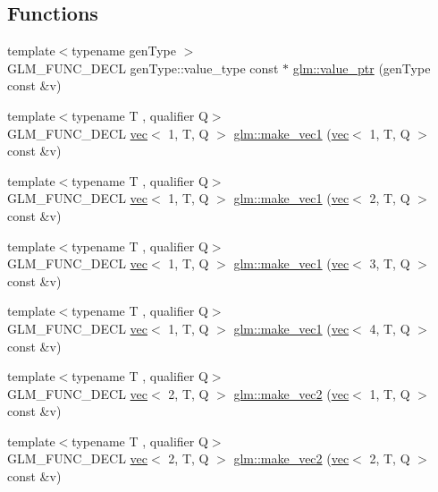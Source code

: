 \subsection*{Functions}
\begin{DoxyCompactItemize}
\item 
{\footnotesize template$<$typename gen\+Type $>$ }\\G\+L\+M\+\_\+\+F\+U\+N\+C\+\_\+\+D\+E\+CL gen\+Type\+::value\+\_\+type const  $\ast$ \hyperlink{group__gtc__type__ptr_ga1c64669e1ba1160ad9386e43dc57569a}{glm\+::value\+\_\+ptr} (gen\+Type const \&v)
\item 
{\footnotesize template$<$typename T , qualifier Q$>$ }\\G\+L\+M\+\_\+\+F\+U\+N\+C\+\_\+\+D\+E\+CL \hyperlink{structglm_1_1vec}{vec}$<$ 1, T, Q $>$ \hyperlink{group__gtc__type__ptr_ga4135f03f3049f0a4eb76545c4967957c}{glm\+::make\+\_\+vec1} (\hyperlink{structglm_1_1vec}{vec}$<$ 1, T, Q $>$ const \&v)
\item 
{\footnotesize template$<$typename T , qualifier Q$>$ }\\G\+L\+M\+\_\+\+F\+U\+N\+C\+\_\+\+D\+E\+CL \hyperlink{structglm_1_1vec}{vec}$<$ 1, T, Q $>$ \hyperlink{group__gtc__type__ptr_ga13c92b81e55f201b052a6404d57da220}{glm\+::make\+\_\+vec1} (\hyperlink{structglm_1_1vec}{vec}$<$ 2, T, Q $>$ const \&v)
\item 
{\footnotesize template$<$typename T , qualifier Q$>$ }\\G\+L\+M\+\_\+\+F\+U\+N\+C\+\_\+\+D\+E\+CL \hyperlink{structglm_1_1vec}{vec}$<$ 1, T, Q $>$ \hyperlink{group__gtc__type__ptr_ga3c23cc74086d361e22bbd5e91a334e03}{glm\+::make\+\_\+vec1} (\hyperlink{structglm_1_1vec}{vec}$<$ 3, T, Q $>$ const \&v)
\item 
{\footnotesize template$<$typename T , qualifier Q$>$ }\\G\+L\+M\+\_\+\+F\+U\+N\+C\+\_\+\+D\+E\+CL \hyperlink{structglm_1_1vec}{vec}$<$ 1, T, Q $>$ \hyperlink{group__gtc__type__ptr_ga6af06bb60d64ca8bcd169e3c93bc2419}{glm\+::make\+\_\+vec1} (\hyperlink{structglm_1_1vec}{vec}$<$ 4, T, Q $>$ const \&v)
\item 
{\footnotesize template$<$typename T , qualifier Q$>$ }\\G\+L\+M\+\_\+\+F\+U\+N\+C\+\_\+\+D\+E\+CL \hyperlink{structglm_1_1vec}{vec}$<$ 2, T, Q $>$ \hyperlink{group__gtc__type__ptr_ga8476d0e6f1b9b4a6193cc25f59d8a896}{glm\+::make\+\_\+vec2} (\hyperlink{structglm_1_1vec}{vec}$<$ 1, T, Q $>$ const \&v)
\item 
{\footnotesize template$<$typename T , qualifier Q$>$ }\\G\+L\+M\+\_\+\+F\+U\+N\+C\+\_\+\+D\+E\+CL \hyperlink{structglm_1_1vec}{vec}$<$ 2, T, Q $>$ \hyperlink{group__gtc__type__ptr_gae54bd325a08ad26edf63929201adebc7}{glm\+::make\+\_\+vec2} (\hyperlink{structglm_1_1vec}{vec}$<$ 2, T, Q $>$ const \&v)

\end{DoxyCompactItemize}
